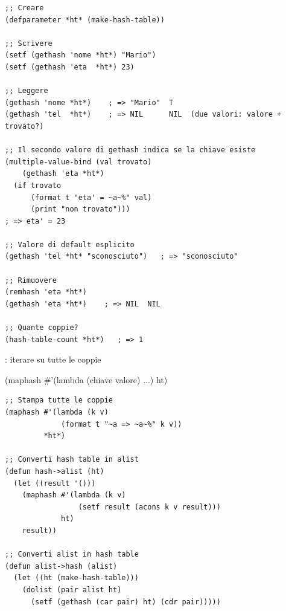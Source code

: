 \begin{esempio}
\begin{lstlisting}
;; Creare
(defparameter *ht* (make-hash-table))

;; Scrivere
(setf (gethash 'nome *ht*) "Mario")
(setf (gethash 'eta  *ht*) 23)

;; Leggere
(gethash 'nome *ht*)    ; => "Mario"  T
(gethash 'tel  *ht*)    ; => NIL      NIL  (due valori: valore + trovato?)

;; Il secondo valore di gethash indica se la chiave esiste
(multiple-value-bind (val trovato)
    (gethash 'eta *ht*)
  (if trovato
      (format t "eta' = ~a~%" val)
      (print "non trovato")))
; => eta' = 23

;; Valore di default esplicito
(gethash 'tel *ht* "sconosciuto")   ; => "sconosciuto"

;; Rimuovere
(remhash 'eta *ht*)
(gethash 'eta *ht*)    ; => NIL  NIL

;; Quante coppie?
(hash-table-count *ht*)   ; => 1
\end{lstlisting}
\end{esempio}


\begin{concetto}{: iterare su tutte le coppie}
\begin{sintassi}
(maphash \#'(lambda (chiave valore) ...) ht)
\end{sintassi}
\end{concetto}

\begin{esempio}
\begin{lstlisting}
;; Stampa tutte le coppie
(maphash #'(lambda (k v)
             (format t "~a => ~a~%" k v))
         *ht*)

;; Converti hash table in alist
(defun hash->alist (ht)
  (let ((result '()))
    (maphash #'(lambda (k v)
                 (setf result (acons k v result)))
             ht)
    result))

;; Converti alist in hash table
(defun alist->hash (alist)
  (let ((ht (make-hash-table)))
    (dolist (pair alist ht)
      (setf (gethash (car pair) ht) (cdr pair)))))
\end{lstlisting}
\end{esempio}


